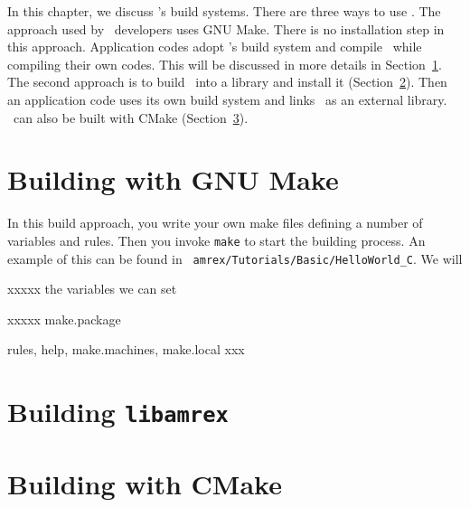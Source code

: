 
In this chapter, we discuss \amrex's build systems.  There are three
ways to use \amrex.  The approach used by \amrex\ developers uses GNU
Make.  There is no installation step in this approach.  Application
codes adopt \amrex's build system and compile \amrex\ while compiling
their own codes.  This will be discussed in more details in
Section~\ref{build:make}.  The second approach is to build \amrex\
into a library and install it (Section~\ref{build:lib}).  Then an
application code uses its own build system and links \amrex\ as an
external library.  \amrex\ can also be built with CMake
(Section~\ref{build:cmake}).

\section{Building with GNU Make}
\label{build:make}

In this build approach, you write your own make files defining a
number of variables and rules.  Then you invoke {\tt make} to start
the building process.  An example of this can be found in {\tt
  amrex/Tutorials/Basic/HelloWorld\_C}.  We will 

xxxxx the variables we can set

xxxxx make.package

rules, help, make.machines, make.local xxx 

\section{Building {\tt libamrex}}
\label{build:lib}

\section{Building with CMake}
\label{build:cmake}


